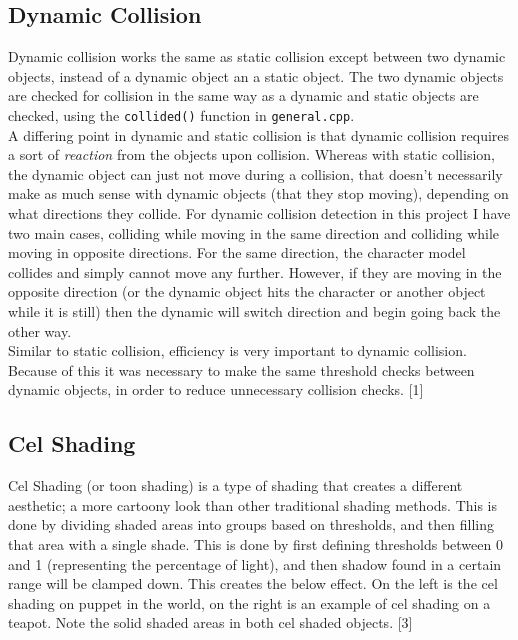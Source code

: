 \documentclass {article}
\begin{document}
\subsection{Dynamic Collision}
Dynamic collision works the same as static collision except between two dynamic objects, instead of a dynamic object an a static object. The two dynamic objects are checked for collision in the same way as a dynamic and static objects are checked, using the \texttt{collided()} function in \texttt{general.cpp}. \\ \newline
A differing point in dynamic and static collision is that dynamic collision requires a sort of \textit{reaction} from the objects upon collision. Whereas with static collision, the dynamic object can just not move during a collision, that doesn't necessarily make as much sense with dynamic objects (that they stop moving), depending on what directions they collide. For dynamic collision detection in this project I have two main cases, colliding while moving in the same direction and colliding while moving in opposite directions. For the same direction, the character model collides and simply cannot move any further. However, if they are moving in the opposite direction (or the dynamic object hits the character or another object while it is still) then the dynamic will switch direction and begin going back the other way. \\ \newline
Similar to static collision, efficiency is very important to dynamic collision. Because of this it was necessary to make the same threshold checks between dynamic objects, in order to reduce unnecessary collision checks. [1]

\subsection{Cel Shading}
Cel Shading (or toon shading) is a type of shading that creates a different aesthetic; a more cartoony look than other traditional shading methods. This is done by dividing shaded areas into groups based on thresholds, and then filling that area with a single shade. This is done by first defining thresholds between 0 and 1 (representing the percentage of light), and then shadow found in a certain range will be clamped down. This creates the below effect. On the left is the cel shading on puppet in the world, on the right is an example of cel shading on a teapot. Note the solid shaded areas in both cel shaded objects. [3]\\ \newline
\end{document}
